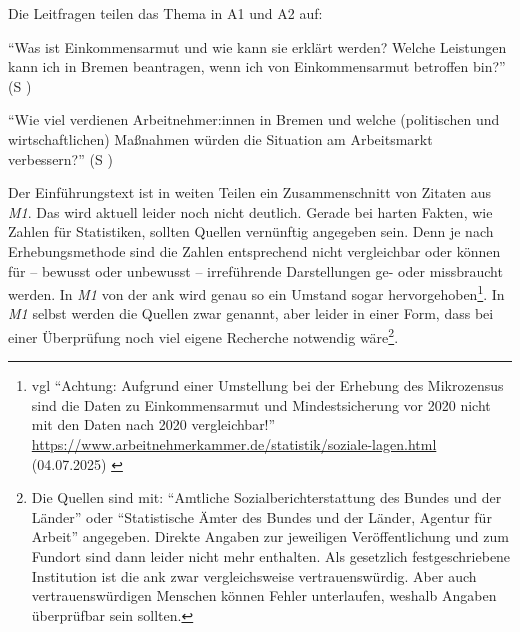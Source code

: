 Die Leitfragen teilen das Thema in A1 und A2 auf: 
\begin{myitemize}
    \item \enquote{Was ist Einkommensarmut und wie kann sie erklärt werden? Welche Leistungen kann ich in Bremen beantragen, wenn ich von Einkommensarmut betroffen bin?} (\gls{S} \pageref{ARBEITSLEBEN-A1})
    \item \enquote{Wie viel verdienen Arbeitnehmer:innen in Bremen und welche (politischen und wirtschaftlichen) Maßnahmen würden die Situation am Arbeitsmarkt verbessern?}  (\gls{S} \pageref{ARBEITSLEBEN-A2})
\end{myitemize}

Der Einführungstext ist in weiten Teilen ein Zusammenschnitt von Zitaten aus \emph{M1}. Das wird aktuell leider noch nicht deutlich. Gerade bei harten Fakten, wie Zahlen für Statistiken, sollten Quellen vernünftig angegeben sein. Denn je nach Erhebungsmethode sind die Zahlen entsprechend nicht vergleichbar oder können für -- bewusst oder unbewusst -- irreführende Darstellungen ge- oder missbraucht werden. In \emph{M1} von der \gls{ank} wird genau so ein Umstand sogar hervorgehoben\footnote{
    \gls{vgl} \enquote{Achtung: Aufgrund einer Umstellung bei der Erhebung des Mikrozensus sind die Daten zu Einkommensarmut und Mindestsicherung vor 2020 nicht mit den Daten nach 2020 vergleichbar!} \url{https://www.arbeitnehmerkammer.de/statistik/soziale-lagen.html} (04.07.2025) \label{MikrozensusNichtVgl.bar2020}}. 
In \emph{M1} selbst werden die Quellen zwar genannt, aber leider in einer Form, dass bei einer Überprüfung noch viel eigene Recherche notwendig wäre\footnote{
    Die Quellen sind mit: \enquote{Amtliche Sozialberichterstattung des Bundes und der Länder} oder \enquote{Statistische Ämter des Bundes und der Länder, Agentur für Arbeit} angegeben. Direkte Angaben zur jeweiligen Veröffentlichung und zum Fundort sind dann leider nicht mehr enthalten. Als gesetzlich festgeschriebene Institution ist die \gls{ank} zwar vergleichsweise vertrauenswürdig. Aber auch vertrauenswürdigen Menschen können Fehler unterlaufen, weshalb Angaben überprüfbar sein sollten.}.



